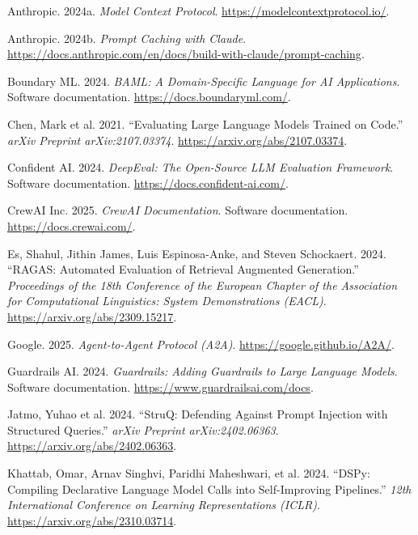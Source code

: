 \documentclass[
]{article}
\newlength{\cslhangindent}
\newenvironment{CSLReferences}[2] %
 {\begin{list}{}{%
  \setlength{\itemindent}{0pt}
  \setlength{\leftmargin}{0pt}
  \setlength{\parsep}{0pt}
  \ifodd #1
   \setlength{\leftmargin}{\cslhangindent}
   \setlength{\itemindent}{-1\cslhangindent}
  \fi
  \setlength{\itemsep}{#2\baselineskip}}}
 {\end{list}}
\begin{document}
\protect{}\label{refs}
\begin{CSLReferences}{1}{1}
Anthropic. 2024a. \emph{Model Context Protocol}.
\url{https://modelcontextprotocol.io/}.

Anthropic. 2024b. \emph{Prompt Caching with Claude}.
\url{https://docs.anthropic.com/en/docs/build-with-claude/prompt-caching}.

Boundary ML. 2024. \emph{{BAML}: A Domain-Specific Language for {AI}
Applications}. Software documentation.
\url{https://docs.boundaryml.com/}.

{Chen, Mark et al.} 2021. {``Evaluating Large Language Models Trained on
Code.''} \emph{arXiv Preprint arXiv:2107.03374}.
\url{https://arxiv.org/abs/2107.03374}.

Confident AI. 2024. \emph{{DeepEval}: The Open-Source {LLM} Evaluation
Framework}. Software documentation.
\url{https://docs.confident-ai.com/}.

CrewAI Inc. 2025. \emph{{CrewAI} Documentation}. Software documentation.
\url{https://docs.crewai.com/}.

Es, Shahul, Jithin James, Luis Espinosa-Anke, and Steven Schockaert.
2024. {``{RAGAS}: Automated Evaluation of Retrieval Augmented
Generation.''} \emph{Proceedings of the 18th Conference of the European
Chapter of the Association for Computational Linguistics: System
Demonstrations (EACL)}. \url{https://arxiv.org/abs/2309.15217}.

Google. 2025. \emph{Agent-to-Agent Protocol ({A2A})}.
\url{https://google.github.io/A2A/}.

Guardrails AI. 2024. \emph{Guardrails: Adding Guardrails to Large
Language Models}. Software documentation.
\url{https://www.guardrailsai.com/docs}.

{Jatmo, Yuhao et al.} 2024. {``{StruQ}: Defending Against Prompt
Injection with Structured Queries.''} \emph{arXiv Preprint
arXiv:2402.06363}. \url{https://arxiv.org/abs/2402.06363}.

Khattab, Omar, Arnav Singhvi, Paridhi Maheshwari, et al. 2024.
{``{DSPy}: Compiling Declarative Language Model Calls into
Self-Improving Pipelines.''} \emph{12th International Conference on
Learning Representations (ICLR)}.
\url{https://arxiv.org/abs/2310.03714}.


\end{CSLReferences}
\end{document}

